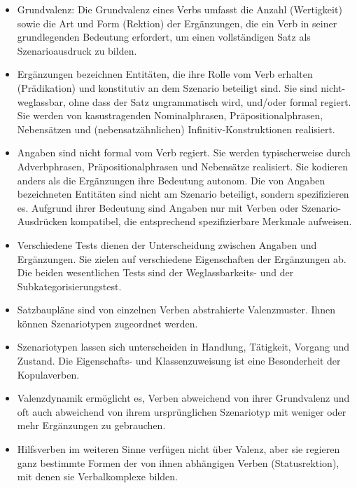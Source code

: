 \begin{itemize}  

\item Grundvalenz: Die Grundvalenz eines Verbs umfasst die Anzahl (Wertigkeit) sowie die Art und Form (Rektion) der Ergänzungen, die ein Verb in seiner grundlegenden Bedeutung erfordert, um einen vollständigen Satz als Szenarioausdruck zu bilden. 

\item Ergänzungen bezeichnen Entitäten, die ihre Rolle vom Verb erhalten (Prädikation) und konstitutiv an dem Szenario beteiligt sind. Sie sind nicht-weglassbar, ohne dass der Satz ungrammatisch wird, und/oder formal regiert. Sie werden von kasustragenden Nominalphrasen, Präpositionalphrasen, Nebensätzen und (nebensatzähnlichen) Infinitiv-Konstruktionen realisiert. 

\item Angaben sind nicht formal vom Verb regiert. Sie werden typischerweise durch Adverbphrasen, Präpositionalphrasen und Nebensätze realisiert. Sie kodieren anders als die Ergänzungen ihre Bedeutung autonom. Die von Angaben bezeichneten Entitäten sind nicht am Szenario beteiligt, sondern spezifizieren es. Aufgrund ihrer Bedeutung sind Angaben nur mit Verben oder Szenario-Ausdrücken kompatibel, die entsprechend spezifizierbare Merkmale aufweisen.

\item Verschiedene Tests dienen der Unterscheidung zwischen Angaben und Ergänzungen. Sie zielen auf verschiedene Eigenschaften der Ergänzungen ab. Die beiden wesentlichen Tests sind der Weglassbarkeits- und der Subkategorisierungstest.     

\item Satzbaupläne sind von einzelnen Verben abstrahierte Valenzmuster. Ihnen können Szenariotypen zugeordnet werden.

\item Szenariotypen lassen sich unterscheiden in Handlung, Tätigkeit, Vorgang und Zustand. Die Eigenschafts- und Klassenzuweisung ist eine Besonderheit der Kopulaverben.

\item Valenzdynamik ermöglicht es, Verben abweichend von ihrer Grundvalenz und oft auch abweichend von ihrem ursprünglichen Szenariotyp mit weniger oder mehr Ergänzungen zu gebrauchen. 

\item Hilfsverben im weiteren Sinne verfügen nicht über Valenz, aber sie regieren ganz bestimmte Formen der von ihnen abhängigen Verben (Statusrektion), mit denen sie Verbalkomplexe bilden.

\end{itemize}  

